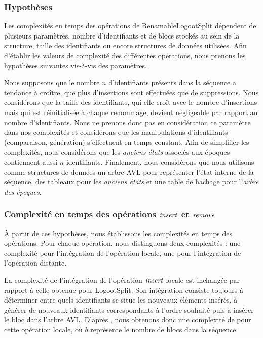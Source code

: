 \label{sec:validation-time-complexity}

\subsubsection{Hypothèses}

Les complexités en temps des opérations de RenamableLogootSplit dépendent de plusieurs paramètres, \eg nombre d'identifiants et de blocs stockés au sein de la structure, taille des identifiants ou encore structures de données utilisées.
Afin d'établir les valeurs de complexité des différentes opérations, nous prenons les hypothèses suivantes vis-à-vis des paramètres.

Nous supposons que le nombre $n$ d'identifiants présents dans la séquence a tendance à croître, \ie que plus d'insertions sont effectuées que de suppressions.
Nous considérons que la taille des identifiants, qui elle croît avec le nombre d'insertions mais qui est réinitialisée à chaque renommage, devient négligeable par rapport au nombre d'identifiants.
Nous ne prenons donc pas en considération ce paramètre dans nos complexités et considérons que les manipulations d'identifiants (comparaison, génération) s'effectuent en temps constant.
Afin de simplifier les complexités, nous considérons que les \emph{anciens états} associés aux époques contiennent aussi $n$ identifiants.
Finalement, nous considérons que nous utilisons comme structures de données un arbre AVL pour représenter l'état interne de la séquence, des tableaux pour les \emph{anciens états} et une table de hachage pour l'\emph{arbre des époques}.

\subsubsection{Complexité en temps des opérations $\mathit{insert}$ et $\mathit{remove}$}

À partir de ces hypothèses, nous établissons les complexités en temps des opérations.
Pour chaque opération, nous distinguons deux complexités : une complexité pour l'intégration de l'opération locale, une pour l'intégration de l'opération distante.

La complexité de l'intégration de l'opération $\mathit{insert}$ locale est inchangée par rapport à celle obtenue pour LogootSplit.
Son intégration consiste toujours à déterminer entre quels identifiants se situe les nouveaux éléments insérés, à générer de nouveaux identifiants correspondants à l'ordre souhaité puis à insérer le bloc dans l'arbre AVL.
D'après \cite{2013-logootsplit}, nous obtenons donc une complexité de  pour cette opération locale, où $b$ représente le nombre de blocs dans la séquence.\\

